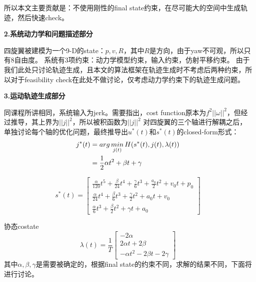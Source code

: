 \documentclass[40pt,a4paper,UTF8]{ctexart}
\numberwithin{equation}{section}
\begin{document}
所以本文主要贡献是：不使用刚性的final state约束，在尽可能大的空间中生成轨迹，然后快速check。

\textbf{2.系统动力学和问题描述部分}

四旋翼被建模为一个9-D的state：$p,v,R$，其中$R$是方向，由于yaw不可观，所以只有8自由度。
系统有3项约束：动力学模型约束，输入约束，仿射平移约束。
由于我们此处只讨论轨迹生成，且本文的算法框架在轨迹生成时不考虑后两种约束，所以对于feasibility check在此处不做讨论，仅考虑动力学约束下的轨迹生成问题。

\textbf{3.运动轨迹生成部分}

同课程所讲相同，系统输入为jerk。需要指出，cost function原本为$f^2||\omega||^2$，但经过推导，其上界为$||j||^2$，所以被积函数为$||j||^2$
对四旋翼的三个轴进行解耦之后，单独讨论每个轴的优化问题，最终推导出$u^*(t)$和$s^*(t)$的closed-form形式：
\begin{align}
j^*(t)&=arg \mathop{min}\limits_{j(t)}H(s^*(t),j(t),\lambda(t)) \notag  \\ 
&=\frac{1}{2}\alpha t^2+\beta t+\gamma
\end{align}


\begin{equation}
s^*(t) = 
\begin{bmatrix}
   \frac{ \alpha}{120}t^5+\frac{\beta}{24}t^4+\frac{\gamma}{6}t^3+\frac{a_0}{2}t^2+v_0t+p_0\\
   \frac{ \alpha}{24}t^4+\frac{\beta}{6}t^3+\frac{\gamma}{2}t^2+a_0t+v_0\\
   \frac{ \alpha}{6}t^3+\frac{\beta}{2}t^2+\gamma t+a_0
\end{bmatrix}
\end{equation}

协态costate
\begin{equation}
    \lambda(t)=\frac{1}{T}
    \begin{bmatrix}
        -2\alpha\\
        2\alpha t+2\beta\\
        -\alpha t^2-2\beta t-2\gamma
    \end{bmatrix}
\end{equation}
其中$\alpha,\beta,\gamma$是需要被确定的，根据final state的约束不同，求解的结果不同，下面将进行讨论。
\end{document}
